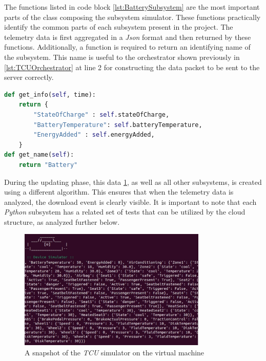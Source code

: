 The functions listed in code block \ref{lst:BatterySubsystem} are the most important parts of the class composing the subsystem simulator. These functions practically identify the common parts of each subsystem present in the project. The telemetry data is first aggregated in a \textit{Json} format and then returned by these functions. Additionally, a function is required to return an identifying name of the subsystem. This name is useful to the orchestrator shown previously in \ref{lst:TCUOrchestrator} at line 2 for constructing the data packet to be sent to the server correctly.
\begin{lstlisting}[language=Python, caption={Battery subsystem return code}, label=lst:BatterySubsystem]
def get_info(self, time):
    return {
        "StateOfCharge" : self.stateOfCharge,
        "BatteryTemperature": self.batteryTemperature,
        "EnergyAdded" : self.energyAdded,
    }
def get_name(self):
    return "Battery"  
\end{lstlisting}
During the updating phase, this data \ref{fig:TCUsimulatorP}, as well as all other subsystems, is created using a different algorithm. This ensures that when the telemetry data is analyzed, the download event is clearly visible. It is important to note that each \textit{Python} subsystem has a related set of tests that can be utilized by the cloud structure, as analyzed further below.
\begin{figure}[h]  %
    \centering
    \includegraphics[width=0.8\textwidth]{images/TCUsimulatorP.png}  %
    \caption{A snapshot of the \textit{TCU} simulator on the virtual machine}
    \label{fig:TCUsimulatorP}
\end{figure}

